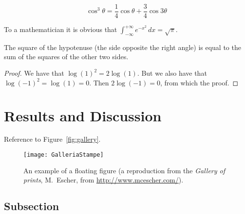 \documentclass[
12pt, %
a4paper, %
oneside, %
headinclude,footinclude, %
BCOR5mm, %
german]{scrartcl}
\begin{document}
\begin{equation}
\cos^3 \theta =\frac{1}{4}\cos\theta+\frac{3}{4}\cos 3\theta
\label{eq:refname2}
\end{equation}

\lipsum[5] %

\begin{definition}[Gauss] 
To a mathematician it is obvious that
$\int_{-\infty}^{+\infty}
e^{-x^2}\,dx=\sqrt{\pi}$. 
\end{definition} 

\begin{theorem}[Pythagoras]
The square of the hypotenuse (the side opposite the right angle) is equal to the sum of the squares of the other two sides.
\end{theorem}

\begin{proof} 
We have that $\log(1)^2 = 2\log(1)$.
But we also have that $\log(-1)^2=\log(1)=0$.
Then $2\log(-1)=0$, from which the proof.
\end{proof}


\section{Results and Discussion}

Reference to Figure~\vref{fig:gallery}. %

\begin{figure}[tb]
\centering 
\texttt{[image: GalleriaStampe]} 
\caption[An example of a floating figure]{An example of a floating figure (a reproduction from the \emph{Gallery of prints}, M.~Escher, from \url{http://www.mcescher.com/}).} %
\label{fig:gallery} 
\end{figure}

\lipsum[10] %


\subsection{Subsection}
\end{document}
